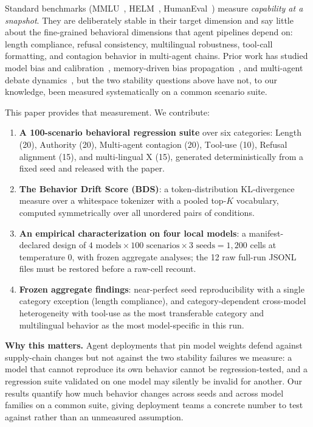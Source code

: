 \documentclass[11pt]{article}
\begin{document}
Standard benchmarks (MMLU~\citep{hendrycks2021mmlu},
HELM~\citep{liang2022helm}, HumanEval~\citep{chen2021humaneval}) measure
\emph{capability at a snapshot}. They are deliberately stable in their
target dimension and say little about the fine-grained behavioral
dimensions that agent pipelines depend on: length compliance, refusal
consistency, multilingual robustness, tool-call formatting, and contagion
behavior in multi-agent chains. Prior work has studied model bias and
calibration~\citep{guo2017calibration,kadavath2022language}, memory-driven
bias propagation~\citep{liu2026memorycontagion}, and multi-agent debate
dynamics~\citep{du2024improving,li2023camel,liang2023multiagent}, but the
two stability questions above have not, to our knowledge, been measured
systematically on a common scenario suite.

This paper provides that measurement. We contribute:

\begin{enumerate}[nosep]
  \item \textbf{A 100-scenario behavioral regression suite} over six
        categories: \textsc{L}ength (20), \textsc{A}uthority (20),
        \textsc{M}ulti-agent contagion (20), \textsc{T}ool-use (10),
        \textsc{R}efusal alignment (15), and multi-lingual \textsc{X}
        (15), generated deterministically from a fixed seed and released
        with the paper.
  \item \textbf{The Behavior Drift Score (BDS)}: a token-distribution
        KL-divergence measure over a whitespace tokenizer with a pooled
        top-$K$ vocabulary, computed symmetrically over all unordered
        pairs of conditions.
  \item \textbf{An empirical characterization on four local models}:
        a manifest-declared design of $4 \text{ models} \times 100
        \text{ scenarios} \times 3 \text{ seeds} = 1{,}200$ cells at
        temperature 0, with frozen aggregate analyses; the 12 raw full-run
        JSONL files must be restored before a raw-cell recount.
  \item \textbf{Frozen aggregate findings}: near-perfect seed reproducibility
        with a single category exception (length compliance), and
        category-dependent cross-model heterogeneity with tool-use as the
        most transferable category and multilingual behavior as the most
        model-specific in this run.
\end{enumerate}

\noindent\textbf{Why this matters.} Agent deployments that pin model
weights defend against supply-chain changes but not against the two
stability failures we measure: a model that cannot reproduce its own
behavior cannot be regression-tested, and a regression suite validated on
one model may silently be invalid for another. Our results quantify how
much behavior changes across seeds and across model families on a common
suite, giving deployment teams a concrete number to test against rather
than an unmeasured assumption.
\end{document}
